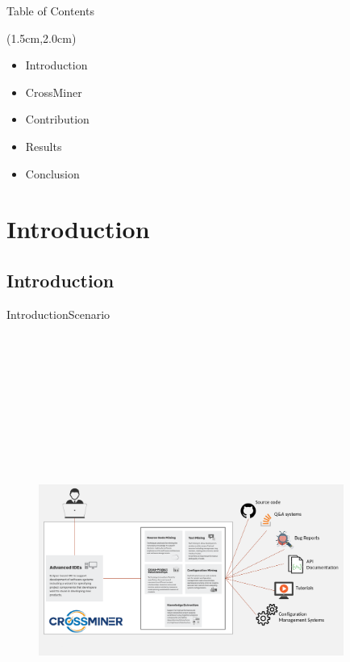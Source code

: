 \documentclass{beamer}
\begin{document}
\begin{frame}{Table of Contents}%

\begin{textblock*}{5.0cm}(1.5cm,2.0cm)
\begin{itemize}
	\item Introduction
	\item CrossMiner
	\item Contribution
	\item Results
	\item Conclusion
\end{itemize}

\end{textblock*}
\end{frame}

\section{Introduction}
\subsection{Introduction}

\begin{frame}{Introduction}{Scenario}
	\begin{figure}[!h]
	\includegraphics[width=10cm,height=15.5cm,keepaspectratio]{images/scenario.png}
	\centering
	\label{fig:Crossminer}
	\end{figure}
\end{frame}
\end{document}
